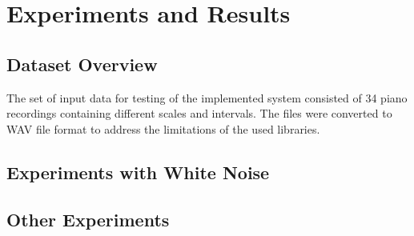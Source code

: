 \chapter{Experiments and Results}\label{chapter:experiments}


\section{Dataset Overview}\label{section:experiments_dataset}

The set of input data for testing of the implemented system consisted of 34 piano recordings containing different scales and intervals. The files were converted to WAV file format to address the limitations of the used libraries.

\section{Experiments with White Noise}
\section{Other Experiments}